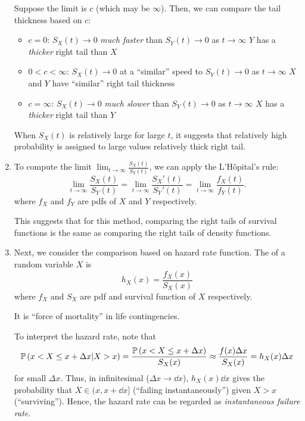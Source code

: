 \begin{enumerate}
Suppose the limit is \(c\) (which may be \(\infty\)). Then, we can compare the
tail thickness based on \(c\):
\begin{itemize}
\item \(c=0\): \(S_X(t)\to 0\) \emph{much faster} than \(S_Y(t)\to 0\) as \(t\to\infty\)
 \(Y\) has a \emph{thicker} right tail than \(X\)
\item \(0<c<\infty\): \(S_X(t)\to 0\) at a ``similar'' speed to \(S_Y(t)\to 0\)
as \(t\to\infty\)  \(X\) and \(Y\) have ``similar'' right
tail thickness
\item \(c=\infty\): \(S_X(t)\to 0\) \emph{much slower} than \(S_Y(t)\to 0\) as \(t\to\infty\)
 \(X\) has a \emph{thicker} right tail than \(Y\)
\end{itemize}
\begin{note}
When \(S_X(t)\) is relatively large for large \(t\), it suggests that
relatively high probability is assigned to large values 
relatively thick right tail.
\end{note}

\item \label{it:lim-surv-ratio-equal-lim-pdf-ratio}
To compute the limit \(\displaystyle \lim_{t\to \infty}\frac{S_X(t)}{S_Y(t)}
\), we can apply the L'H\^{o}pital's rule:
\[
\lim_{t\to \infty}\frac{S_X(t)}{S_Y(t)}
=\lim_{t\to \infty}\frac{S_X'(t)}{S_Y'(t)}
=\boxed{\lim_{t\to \infty}\frac{f_X(t)}{f_Y(t)}}.
\]
where \(f_X\) and \(f_Y\) are pdfs of \(X\) and \(Y\) respectively.

\begin{note}
This suggests that for this method, comparing the right tails of survival
functions is the same as comparing the right tails of density functions.
\end{note}

\item Next, we consider the comparison based on hazard rate
function. The  of a random variable \(X\) is
\[
h_X(x)=\frac{f_X(x)}{S_X(x)}
\]
where \(f_X\) and \(S_X\) are pdf and survival function of \(X\) respectively.

\begin{note}
It is ``force of mortality'' in life contingencies.
\end{note}

To interpret the hazard rate, note that
\[
\mathbb{P}\left(x<X\le x+\Delta x|X>x\right)=\frac{\mathbb{P}\left(x<X\le x+\Delta x\right)}{S_X(x)}
\approx\frac{f(x)\Delta x}{S_X(x)}=h_X(x)\Delta x
\]
for small \(\Delta x\). Thus, in infinitesimal (\(\Delta x\to \dd{x}\)),
\(h_X(x)\dd{x}\) gives the probability that \(X\in(x,x+\dd{x}]\) (``failing
instantaneously'') given \(X>x\) (``surviving'').  Hence, the hazard rate can
be regarded as \emph{instantaneous failure rate}.


\end{enumerate}
